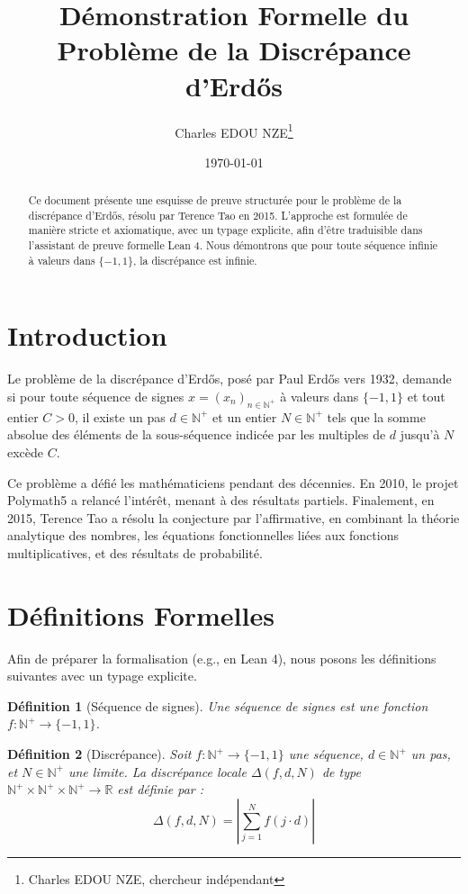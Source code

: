 \documentclass[12pt,a4paper]{article}
\title{Démonstration Formelle du Problème de la Discrépance d'Erdős}
\author{Charles EDOU NZE\thanks{Charles EDOU NZE, chercheur indépendant}}
\date{\today}
\newtheorem{definition}{Définition}
\begin{document}
\maketitle

\begin{abstract}
Ce document présente une esquisse de preuve structurée pour le problème de la discrépance d'Erdős, résolu par Terence Tao en 2015. L'approche est formulée de manière stricte et axiomatique, avec un typage explicite, afin d'être traduisible dans l'assistant de preuve formelle Lean 4. Nous démontrons que pour toute séquence infinie à valeurs dans $\{-1, 1\}$, la discrépance est infinie.
\end{abstract}

\section{Introduction}
Le problème de la discrépance d'Erdős, posé par Paul Erdős vers 1932, demande si pour toute séquence de signes $x = (x_n)_{n \in \mathbb{N}^+}$ à valeurs dans $\{-1, 1\}$ et tout entier $C > 0$, il existe un pas $d \in \mathbb{N}^+$ et un entier $N \in \mathbb{N}^+$ tels que la somme absolue des éléments de la sous-séquence indicée par les multiples de $d$ jusqu'à $N$ excède $C$.

Ce problème a défié les mathématiciens pendant des décennies. En 2010, le projet Polymath5 a relancé l'intérêt, menant à des résultats partiels. Finalement, en 2015, Terence Tao a résolu la conjecture par l'affirmative, en combinant la théorie analytique des nombres, les équations fonctionnelles liées aux fonctions multiplicatives, et des résultats de probabilité.

\section{Définitions Formelles}

Afin de préparer la formalisation (e.g., en Lean 4), nous posons les définitions suivantes avec un typage explicite.

\begin{definition}[Séquence de signes]
Une séquence de signes est une fonction $f : \mathbb{N}^+ \to \{-1, 1\}$.
\end{definition}

\begin{definition}[Discrépance]
Soit $f : \mathbb{N}^+ \to \{-1, 1\}$ une séquence, $d \in \mathbb{N}^+$ un pas, et $N \in \mathbb{N}^+$ une limite. La discrépance locale $\Delta(f, d, N)$ de type $\mathbb{N}^+ \times \mathbb{N}^+ \times \mathbb{N}^+ \to \mathbb{R}$ est définie par :
\begin{equation}
\Delta(f, d, N) = \left| \sum_{j=1}^{N} f(j \cdot d) \right|
\end{equation}
\end{definition}
\end{document}
